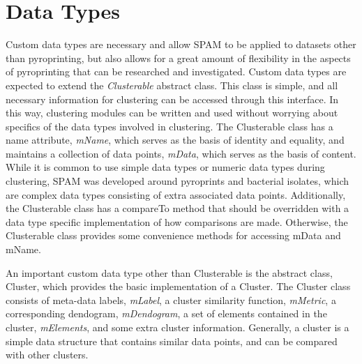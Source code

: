 \documentclass[12pt]{ucthesis}
\begin{document}
   \section{Data Types}\label{sec:data_types}
      Custom data types are necessary and allow SPAM to be applied to datasets
      other than pyroprinting, but also allows for a great amount of
      flexibility in the aspects of pyroprinting that can be researched and
      investigated. Custom data types are expected to extend the
      \textit{Clusterable} abstract class. This class is simple, and all
      necessary information for clustering can be accessed through this
      interface. In this way, clustering modules can be written and used
      without worrying about specifics of the data types involved in
      clustering. The Clusterable class has a name attribute, \textit{mName},
      which serves as the basis of identity and equality, and maintains a
      collection of data points, \textit{mData}, which serves as the basis of
      content. While it is common to use simple data types or numeric data
      types during clustering, SPAM was developed around pyroprints and
      bacterial isolates, which are complex data types consisting of extra
      associated data points. Additionally, the Clusterable class has a
      \textsf{compareTo} method that should be overridden with a data type
      specific implementation of how comparisons are made. Otherwise, the
      Clusterable class provides some convenience methods for accessing mData
      and mName.

      An important custom data type other than Clusterable is the abstract
      class, Cluster, which provides the basic implementation of a
      Cluster. The Cluster class consists of meta-data labels, \textit{mLabel},
      a cluster similarity function, \textit{mMetric}, a corresponding
      dendogram, \textit{mDendogram}, a set of elements contained in the
      cluster, \textit{mElements}, and some extra cluster information.
      Generally, a cluster is a simple data structure that contains similar
      data points, and can be compared with other clusters.
\end{document}
